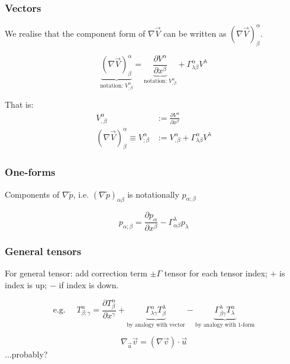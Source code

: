 \documentclass[a4paper]{article} %
\renewcommand{\tilde}{\widetilde}
\begin{document}
\subsubsection{Vectors}
We realise that the component form of $\nabla \vec{V}$ can be written as $(\nabla \vec{V})^{\alpha}_{\beta}$.

\begin{equation}
\underbrace{(\nabla \vec{V})^{\alpha}_{\beta}}_{\text{notation: }V^{\alpha}_{;\beta}}=
\underbrace{\frac{\partial V^{\alpha}}{\partial x^{\beta}}}_{\text{notation: }V^{\alpha}_{,\beta}}
+\Gamma^{\alpha}_{\lambda\beta}V^{\lambda}
\end{equation}

That is:
\begin{align}
V^{\alpha}_{,\beta}&:=\frac{\partial V^{\alpha}}{\partial x^{\beta}}\\
(\nabla \vec{V})^{\alpha}_{\beta}\equiv V^{\alpha}_{;\beta}&:=V^{\alpha}_{,\beta}+\Gamma^{\alpha}_{\lambda\beta}V^{\lambda}
\end{align}

\subsubsection{One-forms}
Components of $\nabla\tilde{p}$, i.e. $(\nabla\tilde{p})_{\alpha\beta}$ is notationally $p_{\alpha;\beta}$

\begin{equation}
p_{\alpha;\beta}=\frac{\partial p_{\alpha}}{\partial x^{\beta}}-\Gamma^{\lambda}_{\alpha\beta} p_{\lambda}
\end{equation}

\subsubsection{General tensors}
For general tensor: add correction term $\pm \Gamma$ tensor for each tensor index; $+$ is index is up; $-$ if index is down.

\begin{equation}
\text{e.g. }\quad T^{\alpha}_{\beta;\gamma}=\frac{\partial T^{\alpha}_{\beta}}{\partial x^{\gamma}}
+\underbrace{\Gamma^{\alpha}_{\lambda\gamma} T^{\lambda}_{\beta}}_{\text{by analogy with vector}}
-\underbrace{\Gamma^{\lambda}_{\beta \gamma}T^{\alpha}_{\lambda}}_{\text{by analogy with 1-form}}
\end{equation}

\begin{equation}
\nabla_{\vec{u}}\vec{v}=(\nabla\vec{v})\cdot \vec{u}
\end{equation}
...probably?
\end{document}

